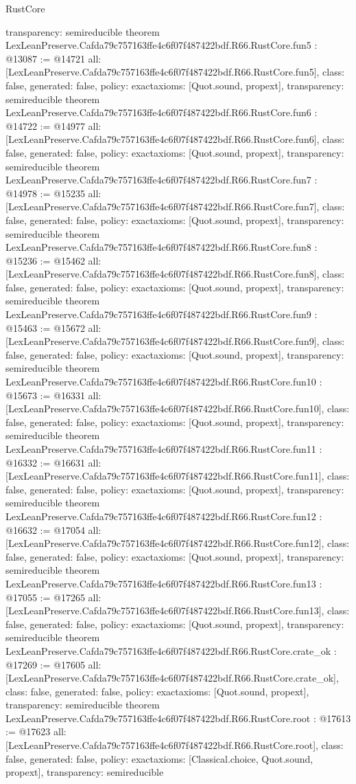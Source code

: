 \begin{lexlean}{RustCore}
\begin{coremodule}
{  transparency: semireducible
}
theorem LexLeanPreserve.Cafda79c757163ffe4c6f07f487422bdf.R66.RustCore.fun5 : @13087 := @14721 {
  all: [LexLeanPreserve.Cafda79c757163ffe4c6f07f487422bdf.R66.RustCore.fun5],
  class: false,
  generated: false,
  policy: exact{axioms: [Quot.sound, propext]},
  transparency: semireducible
}
theorem LexLeanPreserve.Cafda79c757163ffe4c6f07f487422bdf.R66.RustCore.fun6 : @14722 := @14977 {
  all: [LexLeanPreserve.Cafda79c757163ffe4c6f07f487422bdf.R66.RustCore.fun6],
  class: false,
  generated: false,
  policy: exact{axioms: [Quot.sound, propext]},
  transparency: semireducible
}
theorem LexLeanPreserve.Cafda79c757163ffe4c6f07f487422bdf.R66.RustCore.fun7 : @14978 := @15235 {
  all: [LexLeanPreserve.Cafda79c757163ffe4c6f07f487422bdf.R66.RustCore.fun7],
  class: false,
  generated: false,
  policy: exact{axioms: [Quot.sound, propext]},
  transparency: semireducible
}
theorem LexLeanPreserve.Cafda79c757163ffe4c6f07f487422bdf.R66.RustCore.fun8 : @15236 := @15462 {
  all: [LexLeanPreserve.Cafda79c757163ffe4c6f07f487422bdf.R66.RustCore.fun8],
  class: false,
  generated: false,
  policy: exact{axioms: [Quot.sound, propext]},
  transparency: semireducible
}
theorem LexLeanPreserve.Cafda79c757163ffe4c6f07f487422bdf.R66.RustCore.fun9 : @15463 := @15672 {
  all: [LexLeanPreserve.Cafda79c757163ffe4c6f07f487422bdf.R66.RustCore.fun9],
  class: false,
  generated: false,
  policy: exact{axioms: [Quot.sound, propext]},
  transparency: semireducible
}
theorem LexLeanPreserve.Cafda79c757163ffe4c6f07f487422bdf.R66.RustCore.fun10 : @15673 := @16331 {
  all: [LexLeanPreserve.Cafda79c757163ffe4c6f07f487422bdf.R66.RustCore.fun10],
  class: false,
  generated: false,
  policy: exact{axioms: [Quot.sound, propext]},
  transparency: semireducible
}
theorem LexLeanPreserve.Cafda79c757163ffe4c6f07f487422bdf.R66.RustCore.fun11 : @16332 := @16631 {
  all: [LexLeanPreserve.Cafda79c757163ffe4c6f07f487422bdf.R66.RustCore.fun11],
  class: false,
  generated: false,
  policy: exact{axioms: [Quot.sound, propext]},
  transparency: semireducible
}
theorem LexLeanPreserve.Cafda79c757163ffe4c6f07f487422bdf.R66.RustCore.fun12 : @16632 := @17054 {
  all: [LexLeanPreserve.Cafda79c757163ffe4c6f07f487422bdf.R66.RustCore.fun12],
  class: false,
  generated: false,
  policy: exact{axioms: [Quot.sound, propext]},
  transparency: semireducible
}
theorem LexLeanPreserve.Cafda79c757163ffe4c6f07f487422bdf.R66.RustCore.fun13 : @17055 := @17265 {
  all: [LexLeanPreserve.Cafda79c757163ffe4c6f07f487422bdf.R66.RustCore.fun13],
  class: false,
  generated: false,
  policy: exact{axioms: [Quot.sound, propext]},
  transparency: semireducible
}
theorem LexLeanPreserve.Cafda79c757163ffe4c6f07f487422bdf.R66.RustCore.crate_ok : @17269 := @17605 {
  all: [LexLeanPreserve.Cafda79c757163ffe4c6f07f487422bdf.R66.RustCore.crate_ok],
  class: false,
  generated: false,
  policy: exact{axioms: [Quot.sound, propext]},
  transparency: semireducible
}
theorem LexLeanPreserve.Cafda79c757163ffe4c6f07f487422bdf.R66.RustCore.root : @17613 := @17623 {
  all: [LexLeanPreserve.Cafda79c757163ffe4c6f07f487422bdf.R66.RustCore.root],
  class: false,
  generated: false,
  policy: exact{axioms: [Classical.choice, Quot.sound, propext]},
  transparency: semireducible
}


\end{coremodule}
\end{lexlean}
